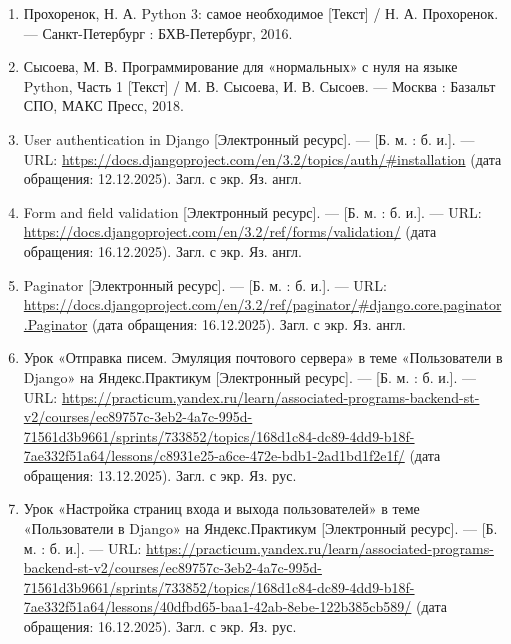 \documentclass[15pt,a4paper]{extarticle}
\begin{document}
\begin{enumerate}
    \item Прохоренок, Н. А. Python 3: самое необходимое [Текст] / Н. А. Прохоренок. — Санкт-Петербург : БХВ-Петербург, 2016.
    
    \item Сысоева, М. В. Программирование для «нормальных» с нуля на языке Python, Часть 1 [Текст] / М. В. Сысоева, И. В. Сысоев. — Москва : Базальт СПО, МАКС Пресс, 2018.
    
    \item User authentication in Django [Электронный ресурс]. — [Б. м. : б. и.]. — URL: \url{https://docs.djangoproject.com/en/3.2/topics/auth/#installation} (дата обращения: 12.12.2025). Загл. с экр. Яз. англ.
    
    \item Form and field validation [Электронный ресурс]. — [Б. м. : б. и.]. — URL: \url{https://docs.djangoproject.com/en/3.2/ref/forms/validation/} (дата обращения: 16.12.2025). Загл. с экр. Яз. англ.
    
    \item Paginator [Электронный ресурс]. — [Б. м. : б. и.]. — URL: \url{https://docs.djangoproject.com/en/3.2/ref/paginator/#django.core.paginator.Paginator} (дата обращения: 16.12.2025). Загл. с экр. Яз. англ.
    
    \item Урок «Отправка писем. Эмуляция почтового сервера» в теме «Пользователи в Django» на Яндекс.Практикум [Электронный ресурс]. — [Б. м. : б. и.]. — URL: \url{https://practicum.yandex.ru/learn/associated-programs-backend-st-v2/courses/ec89757c-3eb2-4a7c-995d-71561d3b9661/sprints/733852/topics/168d1c84-dc89-4dd9-b18f-7ae332f51a64/lessons/c8931e25-a6ce-472e-bdb1-2ad1bd1f2e1f/} (дата обращения: 13.12.2025). Загл. с экр. Яз. рус.
    
    \item Урок «Настройка страниц входа и выхода пользователей» в теме «Пользователи в Django» на Яндекс.Практикум [Электронный ресурс]. — [Б. м. : б. и.]. — URL: \url{https://practicum.yandex.ru/learn/associated-programs-backend-st-v2/courses/ec89757c-3eb2-4a7c-995d-71561d3b9661/sprints/733852/topics/168d1c84-dc89-4dd9-b18f-7ae332f51a64/lessons/40dfbd65-baa1-42ab-8ebe-122b385cb589/} (дата обращения: 16.12.2025). Загл. с экр. Яз. рус.

\end{enumerate}
\end{document}
